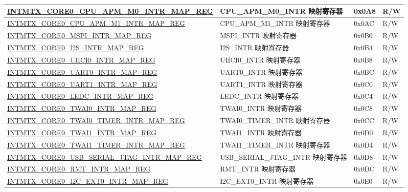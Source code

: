 \begin{longtable}{ | p{10cm} | p{10cm} | p{1.3cm} | p{1cm} | }
\hyperref[regdesc:INTMTXCORE0CPUAPMM0INTRMAPREG]{INTMTX\_CORE0\_CPU\_APM\_M0\_INTR\_MAP\_REG} & CPU\_APM\_M0\_INTR 映射寄存器 & 0x0A8 & R/W  \\ \hline
\hyperref[regdesc:INTMTXCORE0CPUAPMM1INTRMAPREG]{INTMTX\_CORE0\_CPU\_APM\_M1\_INTR\_MAP\_REG} & CPU\_APM\_M1\_INTR 映射寄存器 & 0x0AC & R/W  \\ \hline
\hyperref[regdesc:INTMTXCORE0MSPIINTRMAPREG]{INTMTX\_CORE0\_MSPI\_INTR\_MAP\_REG} & MSPI\_INTR 映射寄存器 & 0x0B0 & R/W  \\ \hline
\hyperref[regdesc:INTMTXCORE0I2SINTRMAPREG]{INTMTX\_CORE0\_I2S\_INTR\_MAP\_REG} & I2S\_INTR 映射寄存器 & 0x0B4 & R/W  \\ \hline
\hyperref[regdesc:INTMTXCORE0UHCI0INTRMAPREG]{INTMTX\_CORE0\_UHCI0\_INTR\_MAP\_REG} & UHCI0\_INTR 映射寄存器 & 0x0B8 & R/W  \\ \hline
\hyperref[regdesc:INTMTXCORE0UART0INTRMAPREG]{INTMTX\_CORE0\_UART0\_INTR\_MAP\_REG} & UART0\_INTR 映射寄存器 & 0x0BC & R/W  \\ \hline
\hyperref[regdesc:INTMTXCORE0UART1INTRMAPREG]{INTMTX\_CORE0\_UART1\_INTR\_MAP\_REG} & UART1\_INTR 映射寄存器 & 0x0C0 & R/W  \\ \hline
\hyperref[regdesc:INTMTXCORE0LEDCINTRMAPREG]{INTMTX\_CORE0\_LEDC\_INTR\_MAP\_REG} & LEDC\_INTR 映射寄存器 & 0x0C4 & R/W  \\ \hline
\hyperref[regdesc:INTMTXCORE0TWAI0INTRMAPREG]{INTMTX\_CORE0\_TWAI0\_INTR\_MAP\_REG} & TWAI0\_INTR 映射寄存器 & 0x0C8 & R/W  \\ \hline
\hyperref[regdesc:INTMTXCORE0TWAI0TIMERINTRMAPREG]{INTMTX\_CORE0\_TWAI0\_TIMER\_INTR\_MAP\_REG} & TWAI0\_TIMER\_INTR 映射寄存器 & 0x0CC & R/W  \\ \hline
\hyperref[regdesc:INTMTXCORE0TWAI1INTRMAPREG]{INTMTX\_CORE0\_TWAI1\_INTR\_MAP\_REG} & TWAI1\_INTR 映射寄存器 & 0x0D0 & R/W  \\ \hline
\hyperref[regdesc:INTMTXCORE0TWAI1TIMERINTRMAPREG]{INTMTX\_CORE0\_TWAI1\_TIMER\_INTR\_MAP\_REG} & TWAI1\_TIMER\_INTR 映射寄存器 & 0x0D4 & R/W  \\ \hline
\hyperref[regdesc:INTMTXCORE0USBSERIALJTAGINTRMAPREG]{INTMTX\_CORE0\_USB\_SERIAL\_JTAG\_INTR\_MAP\_REG} & USB\_SERIAL\_JTAG\_INTR 映射寄存器 & 0x0D8 & R/W  \\ \hline
\hyperref[regdesc:INTMTXCORE0RMTINTRMAPREG]{INTMTX\_CORE0\_RMT\_INTR\_MAP\_REG} & RMT\_INTR 映射寄存器 & 0x0DC & R/W  \\ \hline
\hyperref[regdesc:INTMTXCORE0I2CEXT0INTRMAPREG]{INTMTX\_CORE0\_I2C\_EXT0\_INTR\_MAP\_REG} & I2C\_EXT0\_INTR 映射寄存器 & 0x0E0 & R/W  \\ \hline

\end{longtable}
